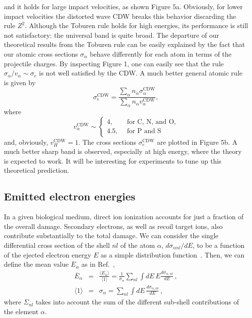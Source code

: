 \documentclass[preprint,showpacs,pra]{revtex4-1}
\begin{document}
and it holds for large impact velocities, as shown Figure 5a.
Obviously, for lower impact velocities the distorted wave CDW breaks 
this behavior discarding the rule $Z^{2}$. Although the Toburen rule 
holds for high energies, its performance is still not satisfactory: 
the universal band is quite broad. The departure of our theoretical 
results from the Toburen rule can be easily explained by the fact that 
our atomic cross sections $\sigma_{\alpha}$ behave differently for 
each atom in terms of the projectile charges. By inspecting Figure 1, 
one can easily see that the rule $\sigma_{\alpha}/v_{\alpha}\sim
\sigma_{e}$ is not well satisfied by the CDW. A much better general 
atomic rule is given by
\begin{equation}
\sigma_{e}^{\text{CDW}}=\frac{\sum\limits_{\alpha}
n_{\alpha}\sigma_{\alpha}^{\text{CDW}}}{\sum\limits_{\alpha}n_{\alpha}
v_{\alpha}^{\text{CDW}}},
\label{32} 
\end{equation}
where 
\begin{equation}
v_{\alpha }^{\text{CDW}} \sim\left\{ 
\begin{array}{ll}
4,\ \ \  & \text{for C, N, and O,} \\ 
4.5,\ \  & \text{for P and S}
\end{array}
\right. 
\label{35}
\end{equation}
and, obviously, $v_{H}^{\text{CDW}}=1$. The cross sections 
$\sigma_{e}^{\text{CDW}}$ 
are plotted in Figure 5b. A much better sharp band is observed, 
especially at high energy, where the theory is expected to work. It 
will be interesting for experiments to tune up this theoretical 
prediction.

\subsection{Emitted electron energies}

In a given biological medium, direct ion ionization accounts for just 
a fraction of the overall damage. Secondary electrons, as well as 
recoil target ions, also contribute substantially to the total damage. 
We can consider the single differential cross section of the shell 
$nl$ of the atom $\alpha$, $d\sigma _{\alpha nl}/dE$, to be a function 
of the ejected electron energy $E$ as a simple distribution 
function~\cite{surdutovic2018}. Then, we can define the mean value 
$\overline{E}_{\alpha}$ as in Ref.~\cite{abril2015},
\begin{eqnarray}
\overline{E}_{\alpha} &=&\frac{\langle E_{\alpha}\rangle}{\langle
1\rangle}=\frac{1}{\sigma_{\alpha}}\sum\limits_{nl}\int dE\,E
\frac{d\sigma_{\alpha,nl}}{dE}\,,  
\label{40} \\
\langle 1\rangle &=&\sigma_{\alpha}=\sum\limits_{nl}\int dE\,
\frac{d\sigma_{\alpha,nl}}{dE}\,,  
\label{50}
\end{eqnarray}
where $\Sigma_{nl}$ takes into account the sum of the different 
sub-shell contributions of the element $\alpha$.
\end{document}
